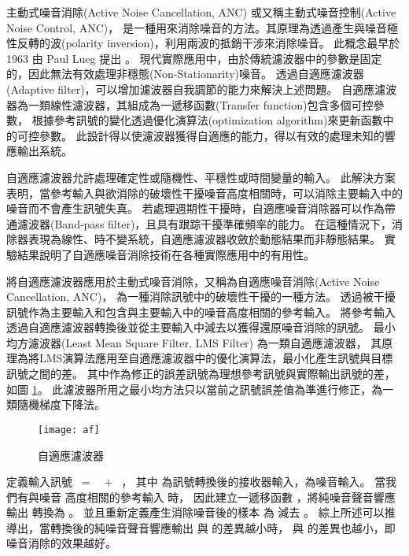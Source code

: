     主動式噪音消除(Active Noise Cancellation, ANC) 或又稱主動式噪音控制(Active Noise Control, ANC)，
是一種用來消除噪音的方法。其原理為透過產生與噪音極性反轉的波(polarity inversion)，利用兩波的抵銷干涉來消除噪音。
此概念最早於 1963 由 Paul Lueg 提出 \cite{elliott1993active}。
現代實際應用中，由於傳統濾波器中的參數是固定的，因此無法有效處理非穩態(Non-Stationarity)噪音。
透過自適應濾波器(Adaptive filter)，可以增加濾波器自我調節的能力來解決上述問題。
自適應濾波器為一類線性濾波器，其組成為一遞移函數(Transfer function)包含多個可控參數，
根據參考訊號的變化透過優化演算法(optimization algorithm)來更新函數中的可控參數。
此設計得以使濾波器獲得自適應的能力，得以有效的處理未知的響應輸出系統\cite{widrow1983adaptive}。

    自適應濾波器允許處理確定性或隨機性、平穩性或時間變量的輸入。
此解決方案表明，當參考輸入與欲消除的破壞性干擾噪音高度相關時，可以消除主要輸入中的噪音而不會產生訊號失真。
若處理週期性干擾時，自適應噪音消除器可以作為帶通濾波器(Band-pass filter)，且具有跟踪干擾準確頻率的能力。
在這種情況下，消除器表現為線性、時不變系統，自適應濾波器收斂於動態結果而非靜態結果。
實驗結果說明了自適應噪音消除技術在各種實際應用中的有用性\cite{singh2001adaptive}。

    將自適應濾波器應用於主動式噪音消除，又稱為自適應噪音消除(Active Noise Cancellation, ANC)，
為一種消除訊號中的破壞性干擾的一種方法。
透過被干擾訊號作為主要輸入和包含與主要輸入中的噪音高度相關的參考輸入。
將參考輸入透過自適應濾波器轉換後並從主要輸入中減去以獲得還原噪音消除的訊號。
最小均方濾波器(Least Mean Square Filter, LMS Filter) 為一類自適應濾波器，
其原理為將LMS演算法應用至自適應濾波器中的優化演算法，最小化產生訊號與目標訊號之間的差\cite{widrow1975adaptive}。
其中作為修正的誤差訊號為理想參考訊號與實際輸出訊號的差，如圖 \ref{fig:af}。
此濾波器所用之最小均方法只以當前之訊號誤差值為準進行修正，為一類隨機梯度下降法。

\begin{figure}[H]
    \centering
    \texttt{[image: af]}
    \caption{自適應濾波器}\label{fig:af}
\end{figure}

    定義輸入訊號 \DEFmicRecJ $~=~$ \DEFmicConv $~+~$ \DEFmicUSJ，
其中 \DEFmicConv 為訊號轉換後的接收器輸入，\DEFmicUSJ 為噪音輸入。
當我們有與噪音 \DEFmicUSJ 高度相關的參考輸入 \DEFmicUSN 時，
因此建立一遞移函數 \DEFfuncAf{\DEFpause}，將純噪音聲音響應輸出 \DEFmicUSN 轉換為 \DEFmicUSD。
並且重新定義產生消除噪音後的樣本 \DEFmicRecREV 為 \DEFmicRecJ 減去 \DEFmicUSD。
綜上所述可以推導出，當轉換後的純噪音聲音響應輸出 \DEFmicUSD 與 \DEFmicUSJ 的差異越小時，
\DEFmicRecREV 與 \DEFmicConv 的差異也越小，即噪音消除的效果越好。


